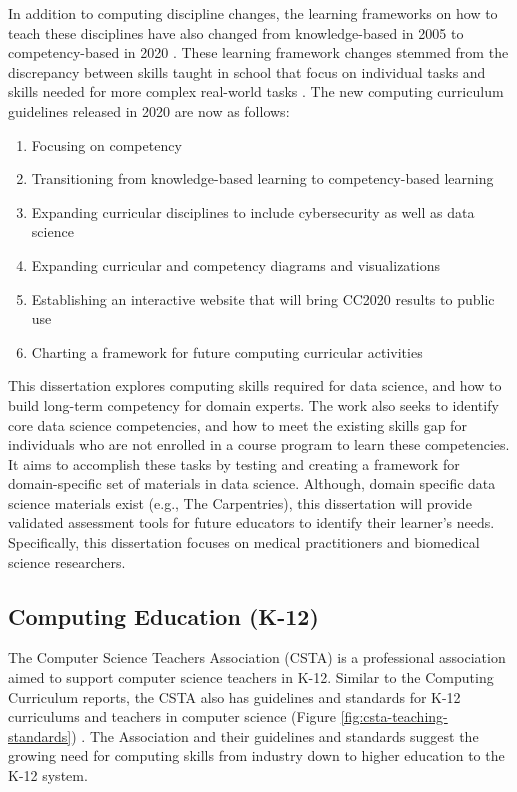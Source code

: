 \documentclass[010-intro.tex]{subfiles}
\begin{document}
    In addition to computing discipline changes,
    the learning frameworks on how to teach these disciplines have also changed
    from knowledge-based in 2005 to competency-based in 2020
    \cite{cc2020}.
    These learning framework changes stemmed from the discrepancy between
    skills taught in school that focus on individual tasks and skills needed for more complex real-world tasks
    \cite{cc2020}.
    The new computing curriculum guidelines released in 2020 are now as follows:

    \begin{enumerate}
        \item Focusing on competency
        \item Transitioning from knowledge-based learning to competency-based learning
        \item Expanding curricular disciplines to include cybersecurity as well as data science
        \item Expanding curricular and competency diagrams and visualizations
        \item Establishing an interactive website that will bring CC2020 results to public use
        \item Charting a framework for future computing curricular activities
    \end{enumerate}

    This dissertation explores computing skills required for data science,
    and how to build long-term competency for domain experts.
    The work also seeks to identify core data science competencies,
    and how to meet the existing skills gap for individuals who are not enrolled
    in a course program to learn these competencies.
    It aims to accomplish these tasks by
    testing and creating a framework for domain-specific set of materials in data science.
    Although, domain specific data science materials exist (e.g., The Carpentries),
    this dissertation will provide validated assessment tools for future educators to identify their
    learner's needs.
    Specifically, this dissertation focuses on medical practitioners and biomedical science researchers.

\subsection{Computing Education (K-12)}
\label{sse:computek12}

    The Computer Science Teachers Association (CSTA)
    is a professional association aimed to support computer science teachers in K-12.
    Similar to the Computing Curriculum reports,
    the CSTA also has guidelines and standards for K-12 curriculums and teachers in computer science
    (Figure \ref{fig:csta-teaching-standards})
    \cite{csta2017}.
    The Association and their guidelines and standards suggest the growing need for computing skills from
    industry down to higher education to the K-12 system.
\end{document}
